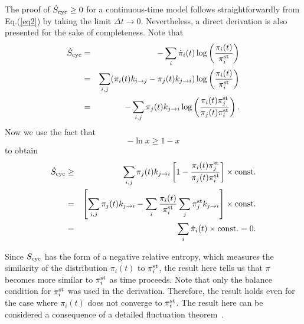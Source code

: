 \documentclass[aps,pre,amsmath,amssymb,floatfix,preprint,nofootinbib]{revtex4}
\begin{document}
The proof of $\dot S_{\rm cyc} \ge 0$ for a continuous-time model follows straightforwardly from Eq.(\ref{eq2}) by taking the limit $\Delta t \to 0$. Nevertheless, a direct derivation is also presented for the sake of completeness. Note that
\begin{eqnarray}
\dot S_{\rm cyc} &=& -\sum_i \dot \pi_i(t) \log \left(\frac{\pi_i(t)}{\pi^{\rm st}_i}\right)\nonumber\\
&=& \sum_{i,j}  (\pi_i(t) k_{i \to j} - \pi_j(t) k_{j \to i})  \log \left(\frac{\pi_i(t)}{\pi^{\rm st}_i}\right)\nonumber\\
&=& -\sum_{i,j}  \pi_j(t) k_{j \to i}   \log \left(\frac{\pi_i(t) \pi^{\rm st}_j}{\pi_j(t) \pi^{\rm st}_i}\right).
\end{eqnarray}
Now we use the fact that
\begin{equation}
-\ln x \ge 1-x  \label{log}
\end{equation}
to obtain
\begin{eqnarray}
\dot S_{\rm cyc} &\ge& \sum_{i,j}  \pi_j(t) k_{j \to i}   \left[ 1 -   \frac{\pi_i(t) \pi^{\rm st}_j}{\pi_j(t) \pi^{\rm st}_i}  \right] \times {\rm const.}\nonumber\\
&=& \left[ \sum_{i,j}  \pi_j(t) k_{j \to i}  -  \sum_{i} \frac{\pi_i(t) }{ \pi^{\rm st}_i}  \sum_{j} \pi^{\rm st}_j k_{j \to i} \right] \times {\rm const.}\nonumber\\
&=& \sum_{i} \dot \pi_i(t)   \times {\rm const.}=0.
\end{eqnarray} 

Since $S_{\rm cyc}$ has the form of a negative relative entropy, which measures the similarity of the distribution $\pi_i(t)$ to $\pi^{\rm st}_i$, the result here tells us that $\pi$ becomes more similar to $\pi^{\rm st}_i$ as time proceeds. Note that only the balance condition for $\pi^{\rm st}_i$ was used in the derivation. Therefore, the result holds even for the case where $\pi_i(t)$ does not converge to $\pi^{\rm st}_i$. The result here can be considered a consequence of a detailed fluctuation theorem~\cite{episto}. 
\end{document}
